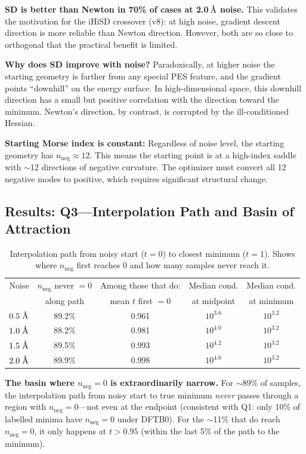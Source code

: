 \documentclass[11pt,a4paper]{article}
\newcommand{\angstrom}{\text{\r{A}}}
\begin{document}
\textbf{SD is better than Newton in 70\% of cases at 2.0\,$\angstrom$ noise.} This validates the motivation for the iHiSD crossover (v8): at high noise, gradient descent direction is more reliable than Newton direction. However, both are so close to orthogonal that the practical benefit is limited.

\textbf{Why does SD improve with noise?} Paradoxically, at higher noise the starting geometry is farther from any special PES feature, and the gradient points ``downhill'' on the energy surface. In high-dimensional space, this downhill direction has a small but positive correlation with the direction toward the minimum. Newton's direction, by contrast, is corrupted by the ill-conditioned Hessian.

\textbf{Starting Morse index is constant:} Regardless of noise level, the starting geometry has $n_\text{neg} \approx 12$. This means the starting point is at a high-index saddle with $\sim$12 directions of negative curvature. The optimizer must convert all 12 negative modes to positive, which requires significant structural change.

\subsection{Results: Q3---Interpolation Path and Basin of Attraction}

\begin{table}[H]
\centering
\caption{Interpolation path from noisy start ($t=0$) to closest minimum ($t=1$). Shows where $n_\text{neg}$ first reaches 0 and how many samples never reach it.}
\label{tab:interp-path}
\begin{tabular}{rcccc}
\toprule
Noise & $n_\text{neg}$ never $=0$ & Among those that do: & Median cond. & Median cond. \\
 & along path & mean $t$ first $= 0$ & at midpoint & at minimum \\
\midrule
$0.5\;\angstrom$ & 89.2\% & 0.961 & $10^{3.6}$ & $10^{3.2}$ \\
$1.0\;\angstrom$ & 88.2\% & 0.981 & $10^{4.0}$ & $10^{3.2}$ \\
$1.5\;\angstrom$ & 89.5\% & 0.993 & $10^{4.2}$ & $10^{3.2}$ \\
$2.0\;\angstrom$ & 89.9\% & 0.998 & $10^{4.6}$ & $10^{3.2}$ \\
\bottomrule
\end{tabular}
\end{table}

\textbf{The basin where $n_\text{neg} = 0$ is extraordinarily narrow.} For $\sim$89\% of samples, the interpolation path from noisy start to true minimum \emph{never} passes through a region with $n_\text{neg} = 0$---not even at the endpoint (consistent with Q1: only 10\% of labelled minima have $n_\text{neg} = 0$ under DFTB0). For the $\sim$11\% that do reach $n_\text{neg} = 0$, it only happens at $t > 0.95$ (within the last 5\% of the path to the minimum).
\end{document}
